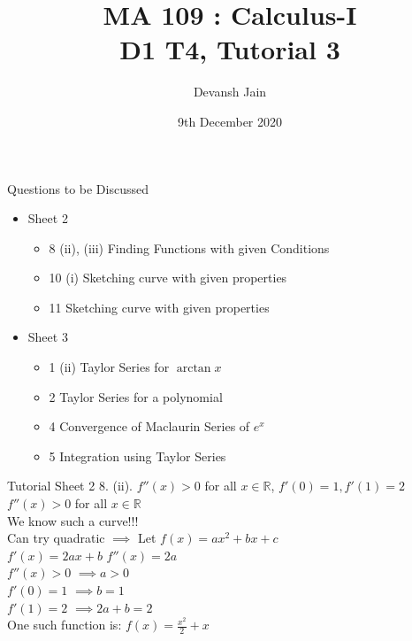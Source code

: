 \documentclass[aspectratio=169]{beamer}
\title{MA 109 : Calculus-I\\ D1 T4, Tutorial 3}
\author{Devansh Jain}
\date[09-12-2020]{9th December 2020}
\institute[IITB]{IIT Bombay}
\begin{document}
\begin{frame}
    \titlepage
\end{frame}

\begin{frame}{Questions to be Discussed}
    \begin{itemize}
        \item Sheet 2
            \begin{itemize}
                \item 8 (ii), (iii) Finding Functions with given Conditions
                \item 10 (i) Sketching curve with given properties
                \item 11 Sketching curve with given properties
            \end{itemize}
        \item Sheet 3
            \begin{itemize}
                \item 1 (ii) Taylor Series for $\arctan x$
                \item 2 Taylor Series for a polynomial
                \item 4 Convergence of Maclaurin Series of $e^x$
                \item 5 Integration using Taylor Series
            \end{itemize}
    \end{itemize}
\end{frame}

\begin{frame}{Tutorial Sheet 2}
    8. (ii). $f''(x) > 0$ for all $x \in \mathbb{R}$, $f'(0) = 1, f'(1) = 2$ \\
    \medskip
    $f''(x) > 0$ for all $x \in \mathbb{R}$ \\
    \medskip
    We know such a curve!!! \\
    \medskip
    Can try quadratic $\implies$ Let $f(x)=ax^2+bx+c$ \\
    $f'(x)=2ax+b$ \hspace{30pt} $f''(x)=2a$ \\
    \medskip
    $f''(x) > 0$  $\implies a>0$ \\
    $f'(0) = 1$ $\implies b=1$ \\
    $f'(1)=2$ $\implies 2a+b=2$ \\
    \medskip
    One such function is: $f(x)=\frac{x^2}{2}+x$ \\
\end{frame}
\end{document}
